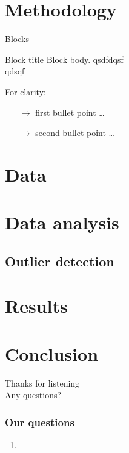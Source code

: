\documentclass[nonav,sleutel]{beamer}
\begin{document}
\section{Methodology}
\begin{frame}{Blocks}
\begin{block}{Block title}
Block body.
qsdfdqsf\\
qdsqf\\
\end{block}
\begin{example}
For clarity:
\begin{itemize}
	\item[$\rightarrow$] first bullet point \ldots
	\item[$\rightarrow$] second bullet  point \ldots
\end{itemize}
\end{example}
\end{frame}

\section{Data}

\section{Data analysis}

\subsection{Outlier detection}


\section{Results}

\section{Conclusion}

\begin{frame}
\begin{center}
\Large{Thanks for listening}\\
Any questions?
\end{center}

\end{frame}

\begin{frame}
\frametitle{Our questions}
\begin{enumerate}
\item 
\end{enumerate}
\end{frame}
\end{document}
